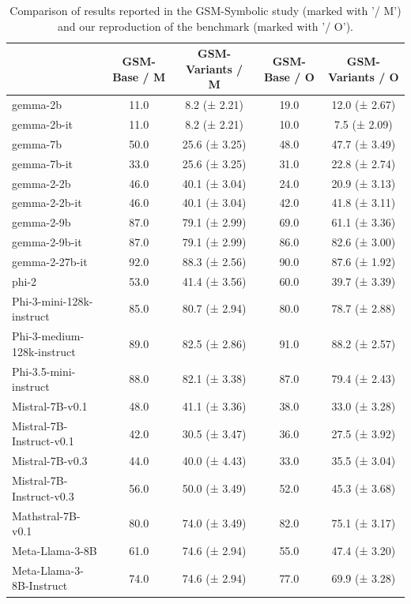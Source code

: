 \documentclass[11pt]{article}
\begin{document}
\begin{table}[H]
\centering
\small
\begin{tabular}{lcccc}
\toprule
 & GSM-Base / M & GSM-Variants / M & GSM-Base / O & GSM-Variants / O \\
\midrule
gemma-2b & 11.0 & 8.2 (± 2.21) & 19.0 & 12.0 (± 2.67) \\
gemma-2b-it & 11.0 & 8.2 (± 2.21) & 10.0 & 7.5 (± 2.09) \\
gemma-7b & 50.0 & 25.6 (± 3.25) & 48.0 & 47.7 (± 3.49) \\
gemma-7b-it & 33.0 & 25.6 (± 3.25) & 31.0 & 22.8 (± 2.74) \\
gemma-2-2b & 46.0 & 40.1 (± 3.04) & 24.0 & 20.9 (± 3.13) \\
gemma-2-2b-it & 46.0 & 40.1 (± 3.04) & 42.0 & 41.8 (± 3.11) \\
gemma-2-9b & 87.0 & 79.1 (± 2.99) & 69.0 & 61.1 (± 3.36) \\
gemma-2-9b-it & 87.0 & 79.1 (± 2.99) & 86.0 & 82.6 (± 3.00) \\
gemma-2-27b-it & 92.0 & 88.3 (± 2.56) & 90.0 & 87.6 (± 1.92) \\
phi-2 & 53.0 & 41.4 (± 3.56) & 60.0 & 39.7 (± 3.39) \\
Phi-3-mini-128k-instruct & 85.0 & 80.7 (± 2.94) & 80.0 & 78.7 (± 2.88) \\
Phi-3-medium-128k-instruct & 89.0 & 82.5 (± 2.86) & 91.0 & 88.2 (± 2.57) \\
Phi-3.5-mini-instruct & 88.0 & 82.1 (± 3.38) & 87.0 & 79.4 (± 2.43) \\
Mistral-7B-v0.1 & 48.0 & 41.1 (± 3.36) & 38.0 & 33.0 (± 3.28) \\
Mistral-7B-Instruct-v0.1 & 42.0 & 30.5 (± 3.47) & 36.0 & 27.5 (± 3.92) \\
Mistral-7B-v0.3 & 44.0 & 40.0 (± 4.43) & 33.0 & 35.5 (± 3.04) \\
Mistral-7B-Instruct-v0.3 & 56.0 & 50.0 (± 3.49) & 52.0 & 45.3 (± 3.68) \\
Mathstral-7B-v0.1 & 80.0 & 74.0 (± 3.49) & 82.0 & 75.1 (± 3.17) \\
Meta-Llama-3-8B & 61.0 & 74.6 (± 2.94) & 55.0 & 47.4 (± 3.20) \\
Meta-Llama-3-8B-Instruct & 74.0 & 74.6 (± 2.94) & 77.0 & 69.9 (± 3.28) \\
\bottomrule
\end{tabular}
\caption{Comparison of results reported in the GSM-Symbolic study \citeauthor{mirzadeh2025gsm} (marked with '/ M') and our reproduction of the benchmark (marked with '/ O').}
\label{tab:mirzadeh-comparison}
\end{table}
\end{document}
